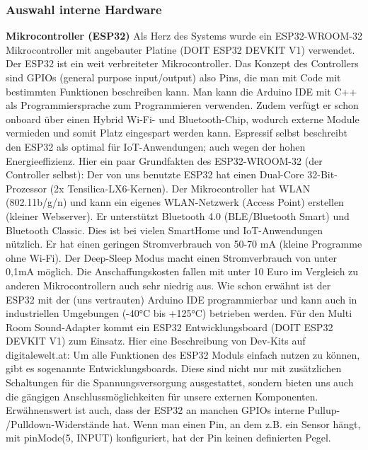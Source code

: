 \documentclass[11pt, twoside]{article}
\begin{document}
\subsubsection{Auswahl interne Hardware}
\textbf{Mikrocontroller (ESP32)}\newline
Als Herz des Systems wurde ein ESP32-WROOM-32 Mikrocontroller mit angebauter Platine (DOIT ESP32 DEVKIT V1) verwendet. Der ESP32 ist ein weit verbreiteter Mikrocontroller. Das Konzept des Controllers sind GPIOs (general purpose input/output) also Pins, die man mit Code mit bestimmten Funktionen beschreiben kann. Man kann die Arduino IDE mit C++ als Programmiersprache zum Programmieren verwenden. Zudem verfügt er schon onboard über einen Hybrid Wi-Fi- und Bluetooth-Chip, wodurch externe Module vermieden und somit Platz eingespart werden kann. Espressif selbst beschreibt den ESP32 als optimal für IoT-Anwendungen; auch wegen der hohen Energieeffizienz.\newline
Hier ein paar Grundfakten des ESP32-WROOM-32 (der Controller selbst):\newline
Der von uns benutzte ESP32 hat einen Dual-Core 32-Bit-Prozessor (2x Tensilica-LX6-Kernen). Der Mikrocontroller hat WLAN (802.11b/g/n) und kann ein eigenes WLAN-Netzwerk (Access Point) erstellen (kleiner Webserver). Er unterstützt Bluetooth 4.0 (BLE/Bluetooth Smart) und Bluetooth Classic. Dies ist bei vielen SmartHome und IoT-Anwendungen nützlich. Er hat einen geringen Stromverbrauch von 50-70 mA (kleine Programme ohne Wi-Fi). Der Deep-Sleep Modus macht einen Stromverbrauch von unter 0,1mA möglich. Die Anschaffungskosten fallen mit unter 10 Euro im Vergleich zu anderen Mikrocontrollern auch sehr niedrig aus.\newline
Wie schon erwähnt ist der ESP32 mit der (uns vertrauten) Arduino IDE programmierbar und kann auch in industriellen Umgebungen (-40°C bis +125°C) betrieben werden.\newline
Für den Multi Room Sound-Adapter kommt ein ESP32 Entwicklungsboard (DOIT ESP32 DEVKIT V1) zum Einsatz.\newline
Hier eine Beschreibung von Dev-Kits auf digitalewelt.at: \glqq Um alle Funktionen des ESP32 Moduls einfach nutzen zu können, gibt es sogenannte Entwicklungsboards. Diese sind nicht nur mit zusätzlichen Schaltungen für die Spannungsversorgung ausgestattet, sondern bieten uns auch die gängigen Anschlussmöglichkeiten für unsere externen Komponenten.\grqq{} \parencite{noauthor_urlnl07_2023}\newline
Erwähnenswert ist auch, dass der ESP32 an manchen GPIOs interne Pullup- /Pulldown-Widerstände hat. \glqq Wenn man einen Pin, an dem z.B. ein Sensor hängt, mit pinMode(5, INPUT) konfiguriert, hat der Pin keinen definierten Pegel.
\end{document}

